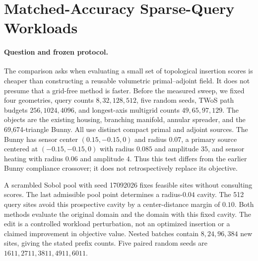 \section{Matched-Accuracy Sparse-Query Workloads}
\label{app:matchedaccuracy}

\paragraph{Question and frozen protocol.}
The comparison asks when evaluating a small set of topological insertion
scores is cheaper than constructing a reusable volumetric primal--adjoint
field. It does not presume that a grid-free method is faster. Before the
measured sweep, we fixed four geometries, query counts $8,32,128,512$, five
random seeds, TWoS path budgets $256,1024,4096$, and longest-axis multigrid
counts $49,65,97,129$. The objects are the existing housing, branching
manifold, annular spreader, and the 69,674-triangle Bunny. All use distinct
compact primal and adjoint sources. The Bunny has sensor center
$(0.15,-0.15,0)$ and radius $0.07$, a primary source centered at
$(-0.15,-0.15,0)$ with radius $0.085$ and amplitude $35$, and sensor heating
with radius $0.06$ and amplitude $4$. Thus this test differs from the earlier
Bunny compliance crossover; it does not retrospectively replace its objective.

A scrambled Sobol pool with seed 17092026 fixes feasible sites without
consulting scores. The last admissible pool point determines a radius-$0.04$
cavity. The 512 query sites avoid this prospective cavity by a center-distance
margin of $0.10$. Both methods evaluate the original domain and the domain
with this fixed cavity. The edit is a controlled workload perturbation, not
an optimized insertion or a claimed improvement in objective value.
Nested batches contain $8,24,96,384$ new sites, giving the stated prefix counts.
Five paired random seeds are $1611,2711,3811,4911,6011$.


